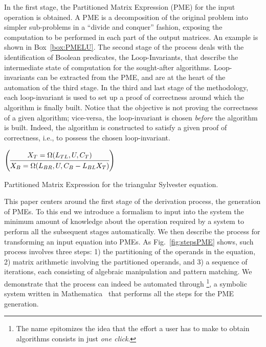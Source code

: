 \documentclass{llncs}
\newcommand{\click}{{\sc{Cl\makebox[.58\width][c]{1}ck}}}
\begin{document}
In the first stage, the Partitioned Matrix Expression (PME) for the input 
operation is obtained. A PME is a decomposition of the original problem 
into simpler sub-problems in a ``divide and conquer'' fashion, exposing the
computation to be performed in each part of the output matrices. 
An example is shown in Box~\ref{box:PMELU}. The second 
stage of the process deals with the identification of Boolean predicates, 
the Loop-Invariants, that describe the intermediate state of computation 
for the sought-after algorithms. Loop-invariants can be extracted from the 
PME, and are at the heart of the automation of the third stage. In the third 
and last stage of the methodology, each loop-invariant is used to set up
a proof of correctness around which the algorithm is finally built.
Notice that the objective is not proving the correctness of a given
algorithm; vice-versa, the loop-invariant is chosen {\em before} the
algorithm is built. Indeed, the algorithm is constructed to 
satisfy a given proof of correctness, i.e., to possess the chosen 
loop-invariant.

\begin{mybox}
\vspace{2mm}
  \centering
	$
        \renewcommand{\arraystretch}{1.2}
		\left( {\begin{array}{@{}c@{}} 
			X_{T} = \Omega(L_{TL}, U, C_{T}) \\\hline
			X_{B} = \Omega(L_{BR}, U, C_{B} - L_{BL} X_{T}) 
		\end{array}} \right)
    $ \vspace{1mm}
	\caption{Partitioned Matrix Expression for the triangular Sylvester equation.} \label{box:PMELU}
\end{mybox}

This paper centers around the first stage of the derivation process, the generation of PMEs.
To this end we introduce a formalism to input into the
system the minimum amount of knowledge about the operation required by a system to 
perform all the subsequent stages automatically.
We then describe the process for transforming an input equation into PMEs.
As Fig.~\ref{fig:stepsPME} shows, such process involves three steps: 
1) the partitioning of the operands in the equation, 
2) matrix arithmetic involving the partitioned operands, and
3) a sequence of iterations, each consisting of algebraic manipulation and
pattern matching.
We demonstrate that the process can indeed be automated through
\click{}\footnote{The name \click{} epitomizes the idea 
that the effort a user has to make to obtain algorithms consists in just {\it one click}.}, 
a symbolic system written in Mathematica~\cite{MathematicaOnline} 
that performs all the steps for the PME generation.
\end{document}
